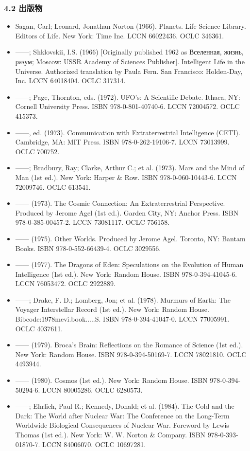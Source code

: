 \subsubsection{4.2 出版物}
\begin{itemize}
\item Sagan, Carl; Leonard, Jonathan Norton (1966). Planets. Life Science Library. Editors of Life. New York: Time Inc. LCCN 66022436. OCLC 346361.
\item ——; Shklovskii, I.S. (1966) [Originally published 1962 as Вселенная, жизнь, разум; Moscow: USSR Academy of Sciences Publisher]. Intelligent Life in the Universe. Authorized translation by Paula Fern. San Francisco: Holden-Day, Inc. LCCN 64018404. OCLC 317314.
\item ——; Page, Thornton, eds. (1972). UFO's: A Scientific Debate. Ithaca, NY: Cornell University Press. ISBN 978-0-801-40740-6. LCCN 72004572. OCLC 415373.
\item ——, ed. (1973). Communication with Extraterrestrial Intelligence (CETI). Cambridge, MA: MIT Press. ISBN 978-0-262-19106-7. LCCN 73013999. OCLC 700752.
\item ——; Bradbury, Ray; Clarke, Arthur C.; et al. (1973). Mars and the Mind of Man (1st ed.). New York: Harper & Row. ISBN 978-0-060-10443-6. LCCN 72009746. OCLC 613541.
\item —— (1973). The Cosmic Connection: An Extraterrestrial Perspective. Produced by Jerome Agel (1st ed.). Garden City, NY: Anchor Press. ISBN 978-0-385-00457-2. LCCN 73081117. OCLC 756158.
\item —— (1975). Other Worlds. Produced by Jerome Agel. Toronto, NY: Bantam Books. ISBN 978-0-552-66439-4. OCLC 3029556.
\item —— (1977). The Dragons of Eden: Speculations on the Evolution of Human Intelligence (1st ed.). New York: Random House. ISBN 978-0-394-41045-6. LCCN 76053472. OCLC 2922889.
\item ——; Drake, F. D.; Lomberg, Jon; et al. (1978). Murmurs of Earth: The Voyager Interstellar Record (1st ed.). New York: Random House. Bibcode:1978mevi.book.....S. ISBN 978-0-394-41047-0. LCCN 77005991. OCLC 4037611.
\item —— (1979). Broca's Brain: Reflections on the Romance of Science (1st ed.). New York: Random House. ISBN 978-0-394-50169-7. LCCN 78021810. OCLC 4493944.
\item —— (1980). Cosmos (1st ed.). New York: Random House. ISBN 978-0-394-50294-6. LCCN 80005286. OCLC 6280573.
\item ——; Ehrlich, Paul R.; Kennedy, Donald; et al. (1984). The Cold and the Dark: The World after Nuclear War: The Conference on the Long-Term Worldwide Biological Consequences of Nuclear War. Foreword by Lewis Thomas (1st ed.). New York: W. W. Norton & Company. ISBN 978-0-393-01870-7. LCCN 84006070. OCLC 10697281.

\end{itemize}
